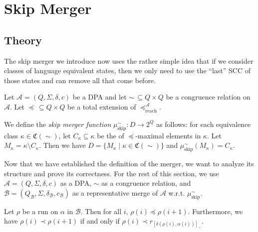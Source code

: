 
\chapter{Skip Merger}
\label{chap:skipper}

\section{Theory}
The skip merger we introduce now uses the rather simple idea that if we consider classes of language equivalent states, then we only need to use the \enquote{last} SCC of those states and can remove all that come before.

\begin{defn}
	Let $\mathcal{A} = (Q, \Sigma, \delta, c)$ be a DPA and let $\sim \,\subseteq Q \times Q$ be a congruence relation on $\mathcal{A}$. Let $\preceq \,\subseteq Q \times Q$ be a total extension of $\preceq_\text{reach}^\mathcal{A}$. 
	
	We define the \emph{skip merger function} $\mu_\text{skip}^\sim : D \rightarrow 2^Q$ as follows: for each equivalence class $\kappa \in \mathfrak{C}(\sim)$, let $C_\kappa \subseteq \kappa$ be the of $\preceq$-maximal elements in $\kappa$. Let $M_\kappa = \kappa \setminus C_\kappa$. Then we have $D = \{ M_\kappa \mid \kappa \in \mathfrak{C}(\sim) \}$ and $\mu_\text{skip}^\sim(M_\kappa) = C_\kappa$.
\end{defn}

\vspace{5pt}

Now that we have established the definition of the merger, we want to analyze its structure and prove its correctness. For the rest of this section, we use $\mathcal{A} = (Q, \Sigma, \delta, c)$ as a DPA, $\sim$ as a congruence relation, and $\mathcal{B} = (Q_\mathcal{B}, \Sigma, \delta_\mathcal{B}, c_\mathcal{B})$ as a representative merge of $\mathcal{A}$ w.r.t. $\mu_\text{skip}^\sim$.

\begin{lem}
\label{lem:skip:run_growing}
	Let $\rho$ be a run on $\alpha$ in $\mathcal{B}$. Then for all $i$, $\rho(i) \preceq \rho(i+1)$.
	Furthermore, we have $\rho(i) \prec \rho(i+1)$ if and only if $\rho(i) \prec r_{[\delta(\rho(i), \alpha(i))]_\sim}$.
\end{lem}

